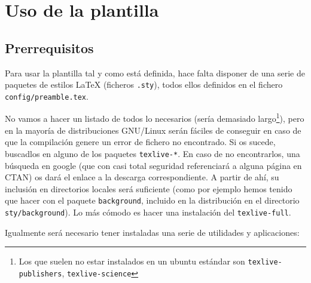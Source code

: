 \section{Uso de la plantilla}
\label{sec:uso-generico-de}


\subsection{Prerrequisitos}
\label{sec:prerrequisitos}

Para usar la plantilla tal y como está definida, hace falta disponer de
una serie de paquetes de estilos \LaTeX{} (ficheros \texttt{.sty}),
todos ellos definidos en el fichero \texttt{config/preamble.tex}.

No vamos a hacer un listado de todos lo necesarios (sería demasiado
largo\footnote{Los que suelen no estar instalados en un ubuntu estándar
  son \texttt{texlive-publishers}, \texttt{texlive-science}}), pero en
la mayoría de distribuciones GNU/Linux serán fáciles de conseguir en
caso de que la compilación genere un error de fichero no encontrado. Si
os sucede, buscadlos en alguno de los paquetes \texttt{texlive-*}. En
caso de no encontrarlos, una búsqueda en google (que con casi total
seguridad referenciará a alguna página en CTAN) os dará el enlace a la
descarga correspondiente. A partir de ahí, su inclusión en directorios
locales será suficiente (como por ejemplo hemos tenido que hacer con el
paquete \texttt{background}, incluido en la distribución en el
directorio \texttt{sty/background}). Lo más cómodo es hacer una
instalación del \texttt{texlive-full}. 

Igualmente será necesario tener instaladas una serie de utilidades y
aplicaciones:

